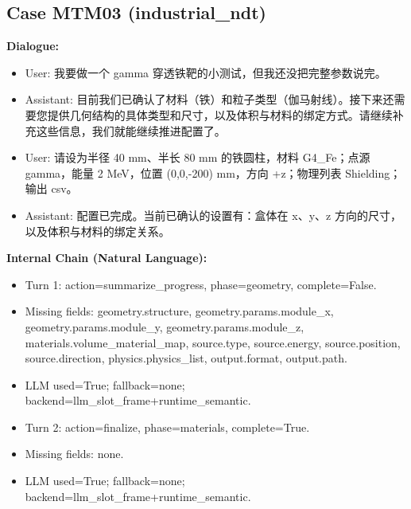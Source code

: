 \documentclass[11pt]{ctexart}
\begin{document}
\subsection{Case MTM03 (industrial\_ndt)}
\textbf{Dialogue:}
\begin{itemize}
\item User: 我要做一个 gamma 穿透铁靶的小测试，但我还没把完整参数说完。
\item Assistant: 目前我们已确认了材料（铁）和粒子类型（伽马射线）。接下来还需要您提供几何结构的具体类型和尺寸，以及体积与材料的绑定方式。请继续补充这些信息，我们就能继续推进配置了。
\item User: 请设为半径 40 mm、半长 80 mm 的铁圆柱，材料 G4\_Fe；点源 gamma，能量 2 MeV，位置 (0,0,-200) mm，方向 +z；物理列表 Shielding；输出 csv。
\item Assistant: 配置已完成。当前已确认的设置有：盒体在 x、y、z 方向的尺寸，以及体积与材料的绑定关系。
\end{itemize}
\textbf{Internal Chain (Natural Language):}
\begin{itemize}
\item Turn 1: action=summarize\_progress, phase=geometry, complete=False.
\item Missing fields: geometry.structure, geometry.params.module\_x, geometry.params.module\_y, geometry.params.module\_z, materials.volume\_material\_map, source.type, source.energy, source.position, source.direction, physics.physics\_list, output.format, output.path.
\item LLM used=True; fallback=none; backend=llm\_slot\_frame+runtime\_semantic.
\item Turn 2: action=finalize, phase=materials, complete=True.
\item Missing fields: none.
\item LLM used=True; fallback=none; backend=llm\_slot\_frame+runtime\_semantic.
\end{itemize}
\end{document}
